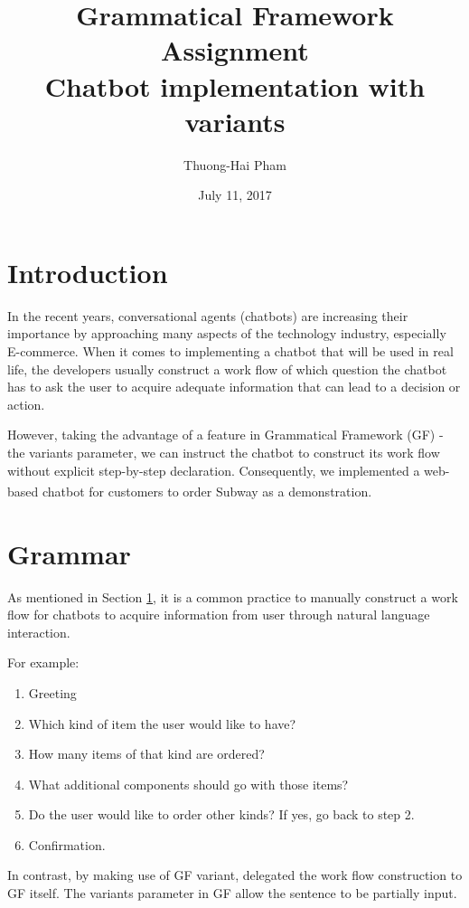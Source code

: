 \documentclass[12pt]{article}
\title{Grammatical Framework Assignment\\Chatbot implementation with variants}
\author{Thuong-Hai Pham}
\date{July 11, 2017}
\begin{document}
\maketitle

\section{Introduction} \label{introduction}

In the recent years, conversational agents (chatbots) are increasing their importance by approaching many aspects of the technology industry, especially E-commerce. When it comes to implementing a chatbot that will be used in real life, the developers usually construct a work flow of which question the chatbot has to ask the user to acquire adequate information that can lead to a decision or action.

However, taking the advantage of a feature in Grammatical Framework (GF) \cite{ranta2004grammatical} - the variants parameter, we can instruct the chatbot to construct its work flow without explicit step-by-step declaration. Consequently, we implemented a web-based chatbot for customers to order Subway\textsuperscript{\textregistered} as a demonstration. 


\section{Grammar}
As mentioned in Section \ref{introduction}, it is a common practice to manually construct a work flow for chatbots to acquire information from user through natural language interaction.

For example:
\begin{enumerate}
    \item Greeting
    \item Which kind of item the user would like to have?
    \item How many items of that kind are ordered?
    \item What additional components should go with those items?
    \item Do the user would like to order other kinds? If yes, go back to step 2.
    \item Confirmation.
\end{enumerate}

In contrast, by making use of GF variant, \cite{bringert2007rapid} delegated the work flow construction to GF itself. The variants parameter in GF allow the sentence to be partially input.
\end{document}
